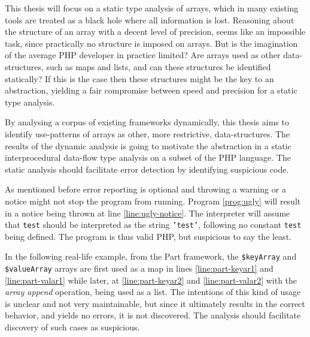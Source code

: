 This thesis will focus on a static type analysis of arrays, which in many existing tools are treated as a black hole where all information is lost.  Reasoning about the structure of an array with a decent level of precision, seems like an impossible task, since practically no structure is imposed on arrays. But is the imagination of the average PHP developer in practice limited? Are arrays used as other data-structures, such as maps and lists, and can these structures be identified statically? If this is the case then these structures might be the key to an abstraction, yielding a fair compromise between speed and precision for a static type analysis. 

By analysing a corpus of existing frameworks dynamically, this thesis aims to identify use-patterns of arrays as other, more restrictive, data-structures. The results of the dynamic analysis is going to motivate the abstraction in a static interprocedural data-flow type analysis on a subset of the PHP language. The static analysis should facilitate error detection by identifying suspicious code. 

As mentioned before error reporting is optional and throwing a warning or a notice might not stop the program from running. Program \ref{prog:ugly} will result in a notice being thrown at line \ref{line:ugly-notice}. The interpreter will assume that \texttt{test} should be interpreted as the string \texttt{'test'}, following no constant \texttt{test} being defined. The program is thus valid PHP, but suspicious to say the least.  

In the following real-life example, from the Part framework, the \texttt{\$keyArray} and \texttt{\$valueArray} arrays are first used as a map in lines \ref{line:part-keyar1} and \ref{line:part-valar1} while later, at \ref{line:part-keyar2} and \ref{line:part-valar2} with the \emph{array append} operation, being used as a list. The intentions of this kind of usage is unclear and not very maintainable, but since it ultimately results in the correct behavior, and yields no errors, it is not discovered. The analysis should facilitate discovery of such cases as suspicious.



